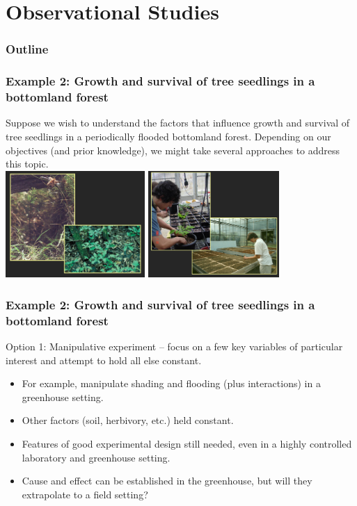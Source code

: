 \documentclass[color=usenames,dvipsnames]{beamer}\usepackage[]{graphicx}\usepackage[]{color}
\begin{document}
\section{Observational Studies}



\begin{frame}
  \frametitle{Outline}
  \Large
  \tableofcontents[currentsection]
\end{frame}



\begin{frame}
  \frametitle{Example 2: Growth and survival of
    tree seedlings in a bottomland forest}
  Suppose we wish to understand the factors that influence growth and
  survival of tree seedlings in a periodically flooded bottomland
  forest.  Depending on our objectives (and prior knowledge), we might
  take several approaches to address this topic. \\
  \vfill
  \includegraphics[height=1.6in]{seedlings-obs} \hfill
  \includegraphics[height=1.6in]{seedlings-exp} 
\end{frame}



\begin{frame}
  \frametitle{Example 2: Growth and survival of
    tree seedlings in a bottomland forest}
  Option 1: Manipulative experiment -- focus on a few key variables of
  particular interest and attempt to hold all else constant.
  \vspace{6pt}
  \begin{itemize}
    \item For example, manipulate shading and flooding (plus
      interactions) in a greenhouse setting.
    \item Other factors (soil, herbivory, etc.)  held constant.
    \item Features of good experimental design still needed, even in a
      highly controlled laboratory and greenhouse setting.
    \item Cause and effect can be established in the greenhouse, but
      will they extrapolate to a field setting?
  \end{itemize}
\end{frame}
\end{document}
